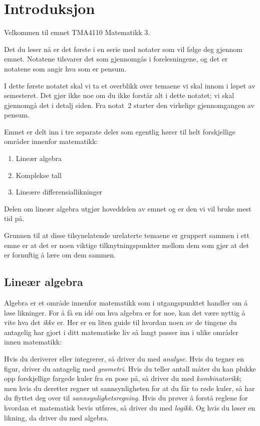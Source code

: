 \chapter*{Introduksjon}

Velkommen til emnet TMA4110 Matematikk 3.

Det du leser nå er det første i en serie med notater som vil følge deg
gjennom emnet.  Notatene tilsvarer det som gjennomgås i
forelesningene, og det er notatene som angir hva som er pensum.

I dette første notatet skal vi ta et overblikk over temaene vi skal
innom i løpet av semesteret.  Det gjør ikke noe om du ikke forstår alt
i dette notatet; vi skal gjennomgå det i detalj siden.  Fra notat~2
starter den virkelige gjennomgangen av pensum.

\smallskip

Emnet er delt inn i tre separate deler som egentlig hører til helt
forskjellige områder innenfor matematikk:
\begin{enumerate}
\item Lineær algebra
\item Komplekse tall
\item Lineære differensiallikninger
\end{enumerate}
Delen om lineær algebra utgjør hoveddelen av emnet og er den vi vil
bruke mest tid på.

\smallskip

Grunnen til at disse tilsynelatende urelaterte temaene er gruppert
sammen i ett emne er at det er noen viktige tilknytningspunkter mellom
dem som gjør at det er fornuftig å lære om dem sammen.


\section*{Lineær algebra}

Algebra er et område innenfor matematikk som i utgangspunktet handler
om å løse likninger.  For å få en idé om hva algebra er for noe, kan
det være nyttig å vite hva det \emph{ikke} er.  Her er en liten guide
til hvordan noen av de tingene du antagelig har gjort i ditt
matematiske liv så langt passer inn i ulike områder innen matematikk:

Hvis du deriverer eller integrerer, så driver du med \emph{analyse}.
Hvis du tegner en figur, driver du antagelig med \emph{geometri}.
Hvis du teller antall måter du kan plukke opp forskjellige fargede
kuler fra en pose på, så driver du med \emph{kombinatorikk}; men hvis
du deretter regner ut sannsynligheten for at du får to røde kuler, så
har du flyttet deg over til \emph{sannsynlighetsregning}.  Hvis du
prøver å forstå reglene for hvordan et matematisk bevis utføres, så
driver du med \emph{logikk}.  Og hvis du løser en likning, da driver
du med algebra.

